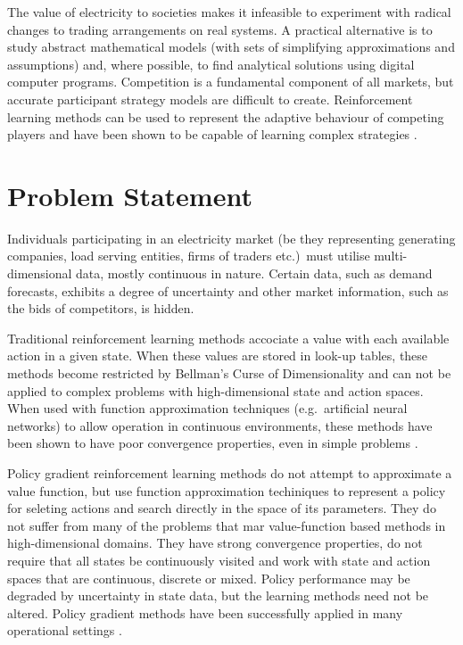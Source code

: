 The value of electricity to societies makes it infeasible to
experiment with radical changes to trading arrangements on real systems.  A
practical alternative is to study abstract mathematical models (with sets of
simplifying approximations and assumptions) and, where possible, to find
analytical solutions using digital computer programs.  Competition is a
fundamental component of all markets, but accurate participant strategy models
are difficult to create.  Reinforcement learning methods can be used to
represent the adaptive behaviour of competing players and have been shown to be
capable of learning complex strategies \cite{tesauro:gammon}.

\section{Problem Statement}%
Individuals participating in an electricity market (be they representing
generating companies, load serving entities, firms of traders etc.)~must
utilise multi-dimensional data, mostly continuous in nature.  Certain data,
such as demand forecasts, exhibits a degree of uncertainty and other market
information, such as the bids of competitors, is hidden.

Traditional reinforcement learning methods accociate a value with each
available action in a given state.  When these values are stored in look-up
tables, these methods become restricted by Bellman's Curse of Dimensionality
\cite{bellman:1961} and can not be applied to complex problems with
high-dimensional state and action spaces.  When used with function
approximation techniques (e.g.~artificial neural networks) to allow operation
in continuous environments, these methods have been shown to have poor
convergence properties, even in simple problems
\cite{gordon:95,baird:95,tsitsiklis:94}.

Policy gradient reinforcement learning methods do not attempt to
approximate a value function, but use function approximation techiniques to
represent a policy for seleting actions and search directly in the space of
its parameters.  They do not suffer from many of the problems that
mar value-function based methods in high-dimensional domains.  They have
strong convergence properties, do not require that all states be continuously
visited and work with state and action spaces that are continuous, discrete or
mixed.  Policy performance may be degraded by uncertainty in state data, but
the learning methods need not be altered.  Policy gradient methods have been
successfully applied in many operational settings
\cite{barto:policy,shaal:robots,moody:direct,peshkin:routing}.

